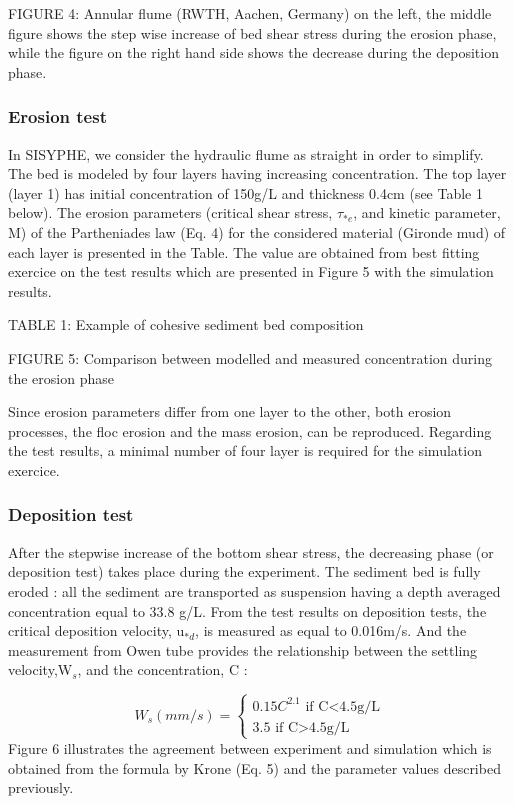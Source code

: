FIGURE 4: Annular
flume (RWTH, Aachen, Germany) on the left, the middle figure shows the step
wise increase of bed shear stress during the erosion phase, while the figure
on the right hand side shows the decrease during the deposition phase. 
\newline

\subsubsection*{Erosion test}

In SISYPHE, we consider the hydraulic flume as straight in order to
simplify. The bed is modeled by four layers having increasing concentration.
The top layer (layer 1) has initial concentration of 150g/L and thickness
0.4cm (see Table 1 below). The erosion parameters (critical shear stress, $%
\tau$$_{*e}$, and kinetic parameter, M) of the Partheniades law (Eq. 4) for
the considered material (Gironde mud) of each layer is presented in the
Table. The value are obtained from best fitting exercice on the test results
which are presented in Figure 5 with the simulation results. \newline

TABLE 1: Example
of cohesive sediment bed composition

FIGURE 5:
Comparison between modelled and measured concentration during the erosion
phase

Since erosion parameters differ from one layer to the other, both erosion
processes, the floc erosion and the mass erosion, can be reproduced.
Regarding the test results, a minimal number of four layer is required for
the simulation exercice. \newline

\subsubsection*{Deposition test}

After the stepwise increase of the bottom shear stress, the decreasing phase
(or deposition test) takes place during the experiment. The sediment bed is
fully eroded : all the sediment are transported as suspension having a depth
averaged concentration equal to 33.8 g/L. From the test results on
deposition tests, the critical deposition velocity, u$_{*d}$, is measured as
equal to 0.016m/s. And the measurement from Owen tube provides the
relationship between the settling velocity,W$_{s}$, and the concentration, C
:

\begin{equation*}
W_{s} (mm/s)=\left\{ 
\begin{array}{c}
0.15C^{2.1} \text{\ \ \ \ if\ \ C<4.5g/L} \\ 
3.5\text{\ \ \ \ \ \ \ \ \ \ \ \ if\ \ C>4.5g/L}%
\end{array}
\right. 
\end{equation*}%
Figure 6 illustrates the agreement between experiment and simulation which
is obtained from the formula by Krone (Eq. 5) and the parameter values
described previously. \newline

